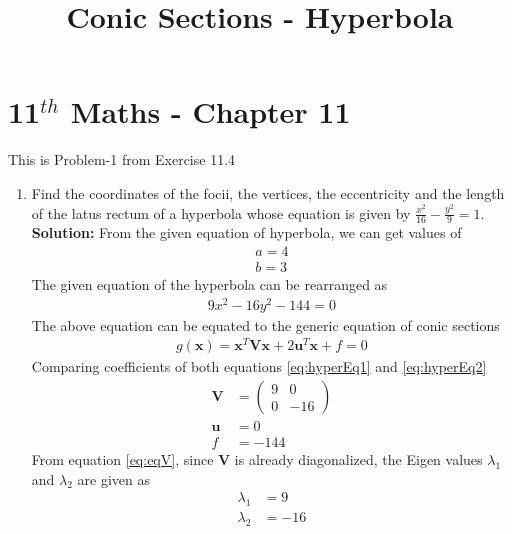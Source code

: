 \documentclass[12pt]{article}
\providecommand{\brak}[1]{\ensuremath{\left(#1\right)}}
\newcommand{\solution}{\noindent \textbf{Solution: }}
\newcommand{\myvec}[1]{\ensuremath{\begin{pmatrix}#1\end{pmatrix}}}
\let\vec\mathbf
\begin{document}
\begin{center}
\title{\textbf{Conic Sections - Hyperbola}}
\date{\vspace{-5ex}} %
\maketitle
\end{center}
\setcounter{page}{1}

\section{11$^{th}$ Maths - Chapter 11}
This is Problem-1 from Exercise 11.4
\begin{enumerate}
	\item Find the coordinates of the focii, the vertices, the eccentricity and the length of the latus rectum of a hyperbola whose equation is given by $\frac{x^2}{16}-\frac{y^2}{9} = 1$. \\ 
\solution 
From the given equation of hyperbola, we can get values of
\begin{align}
    a = 4 \\
    b = 3
\end{align}
The given equation of the hyperbola can be rearranged as
\begin{align}
    \label{eq:hyperEq1}
    9x^2 - 16y^2-144 = 0 
\end{align}
The above equation can be equated to the generic equation of conic sections
\begin{align}
	\label{eq:hyperEq2}
	g\brak{\vec{x}} = \vec{x}^T\vec{V}\vec{x} + 2\vec{u}^T\vec{x} + f = 0 
\end{align}
Comparing coefficients of both equations \eqref{eq:hyperEq1} and \eqref{eq:hyperEq2} 
\begin{align}
	\label{eq:eqV}
	\vec{V} &= \myvec{ 9 & 0 \\ 0 & -16} \\
	\label{eq:eqU}
	\vec{u} &=  0 \\
	\label{eq:eqF}
	f &= -144 
\end{align}
From equation \eqref{eq:eqV}, since $\vec{V}$ is already diagonalized, the Eigen values $\lambda_1$ and $\lambda_2$ are given as 
\begin{align}
	\label{eq:eqEigen1}
	\lambda_1 &= 9 \\
	\label{eq:eqEigen2}
	\lambda_2 &= -16 
\end{align}
\begin{enumerate}

\end{enumerate}
\end{enumerate}
\end{document}
